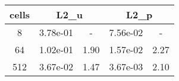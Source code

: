 \documentclass[10pt]{report}
\begin{document}
\begin{table}[H]
\begin{center}
\begin{tabular}{|c|c|c|c|c|} \hline
cells & 
\multicolumn{2}{|c|}{L2_u} & 
\multicolumn{2}{|c|}{L2_p}\\ \hline
8 & 3.78e-01 & - & 7.56e-02 & -\\ \hline
64 & 1.02e-01 & 1.90 & 1.57e-02 & 2.27\\ \hline
512 & 3.67e-02 & 1.47 & 3.67e-03 & 2.10\\ \hline
\end{tabular}
\end{center}
\end{table}
\end{document}
